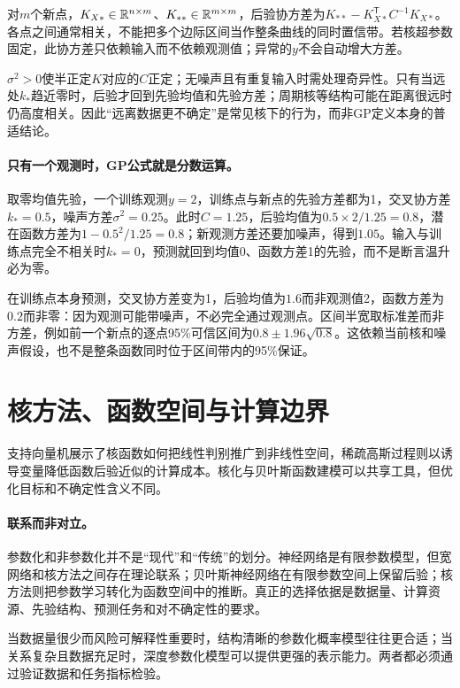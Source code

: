 对$m$个新点，$K_{X*}\in\mathbb{R}^{n\times m}$、$K_{**}\in\mathbb{R}^{m\times m}$，后验协方差为$K_{**}-K_{X*}^{\mathsf T}C^{-1}K_{X*}$。各点之间通常相关，不能把多个边际区间当作整条曲线的同时置信带。若核超参数固定，此协方差只依赖输入而不依赖观测值；异常的$y$不会自动增大方差。

$\sigma^2>0$使半正定$K$对应的$C$正定；无噪声且有重复输入时需处理奇异性。只有当远处$k_*$趋近零时，后验才回到先验均值和先验方差；周期核等结构可能在距离很远时仍高度相关。因此“远离数据更不确定”是常见核下的行为，而非GP定义本身的普适结论。

\paragraph{只有一个观测时，GP公式就是分数运算。}
取零均值先验，一个训练观测$y=2$，训练点与新点的先验方差都为1，交叉协方差$k_*=0.5$，噪声方差$\sigma^2=0.25$。此时$C=1.25$，后验均值为$0.5\times2/1.25=0.8$，潜在函数方差为$1-0.5^2/1.25=0.8$；新观测方差还要加噪声，得到$1.05$。输入与训练点完全不相关时$k_*=0$，预测就回到均值0、函数方差1的先验，而不是断言温升必为零。

在训练点本身预测，交叉协方差变为1，后验均值为$1.6$而非观测值2，函数方差为$0.2$而非零：因为观测可能带噪声，不必完全通过观测点。区间半宽取标准差而非方差，例如前一个新点的逐点95\%可信区间为$0.8\pm1.96\sqrt{0.8}$。这依赖当前核和噪声假设，也不是整条函数同时位于区间带内的95\%保证。

\section{核方法、函数空间与计算边界}
支持向量机展示了核函数如何把线性判别推广到非线性空间，稀疏高斯过程则以诱导变量降低函数后验近似的计算成本\cite{cortes1995svm,titsias2009sparsegp}。核化与贝叶斯函数建模可以共享工具，但优化目标和不确定性含义不同。
\paragraph{联系而非对立。}
参数化和非参数化并不是“现代”和“传统”的划分。神经网络是有限参数模型，但宽网络和核方法之间存在理论联系；贝叶斯神经网络在有限参数空间上保留后验；核方法则把参数学习转化为函数空间中的推断。真正的选择依据是数据量、计算资源、先验结构、预测任务和对不确定性的要求。

\begin{remark}
 当数据量很少而风险可解释性重要时，结构清晰的参数化概率模型往往更合适；当关系复杂且数据充足时，深度参数化模型可以提供更强的表示能力。两者都必须通过验证数据和任务指标检验。
\end{remark}

